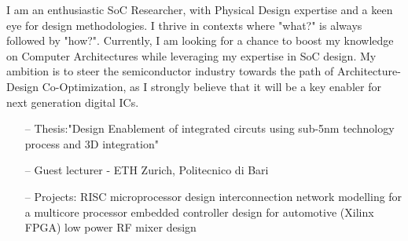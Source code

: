 \documentclass[10pt,a4paper,fancychapters]{altacv}
\begin{document}
%

\begin{fullwidth}
\makecvheader
{}
\justify 
\small{I am an enthusiastic SoC Researcher, with Physical Design expertise and a keen eye for design methodologies. I thrive in contexts where "what?" is always followed by "how?". Currently, I am looking for a chance to boost my knowledge on Computer Architectures while leveraging my expertise in SoC design. My ambition is to steer the semiconductor industry towards the path of  Architecture-Design Co-Optimization, as I strongly believe that it will be a key enabler for next generation digital ICs.}
\end{fullwidth}

%




\begin{itemize}
    \setlength{\itemindent}{0.5em}
    \item[--] \small{Thesis:"Design Enablement of integrated circuts using sub-5nm technology process and 3D integration"}
    \item[--] \small{Guest lecturer - ETH Zurich, Politecnico di Bari} 
\end{itemize}
\medskip


 \begin{itemize}
    \setlength{\itemindent}{0.5em}
    \item[--] \small{Projects: RISC microprocessor design \textbullet\hspace{0.1em} interconnection network modelling for a multicore processor \textbullet\hspace{0.1em} embedded controller design for automotive (Xilinx FPGA) \textbullet\hspace{0.1em} low power RF mixer design}
\end{itemize}
\end{document}
